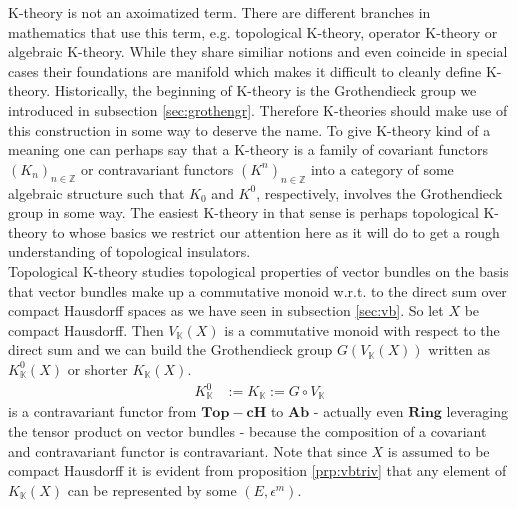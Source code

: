 \nocite{6342e665}
\nocite{8b5861fc}
\nocite{c7f15065}
K-theory is not an axoimatized term. There are different branches in mathematics that use this term, e.g. topological K-theory, operator K-theory or algebraic K-theory. While they share similiar notions and even coincide in special cases their foundations are manifold which makes it difficult to cleanly define K-theory. Historically, the beginning of K-theory is the Grothendieck group we introduced in subsection \ref{sec:grothengr}. Therefore K-theories should make use of this construction in some way to deserve the name. To give K-theory kind of a meaning one can perhaps say that a K-theory is a family of covariant functors $(K_{n})_{n\in\mathbb{Z}}$ or contravariant functors $(K^{n})_{n\in\mathbb{Z}}$ into a category of some algebraic structure such that $K_{0}$ and $K^{0}$, respectively, involves the Grothendieck group in some way. The easiest K-theory in that sense is perhaps topological K-theory to whose basics we restrict our attention here as it will do to get a rough understanding of topological insulators.
\\
Topological K-theory studies topological properties of vector bundles on the basis that vector bundles make up a commutative monoid w.r.t. to the direct sum over compact Hausdorff spaces as we have seen in subsection \ref{sec:vb}. So let $X$ be compact Hausdorff. Then $V_{\mathbb{K}}(X)$ is a commutative monoid with respect to the direct sum and we can build the Grothendieck group $G(V_{\mathbb{K}}(X))$ written as $K_{\mathbb{K}}^{0}(X)$ or shorter $K_{\mathbb{K}}(X)$.
\begin{align*}
  K_{\mathbb{K}}^{0}
  &:=
  K_{\mathbb{K}}
  :=
  G
  \circ
  V_{\mathbb{K}}
\end{align*}
is a contravariant functor from $\mathbf{Top-cH}$ to $\mathbf{Ab}$ - actually even $\mathbf{Ring}$ leveraging the tensor product on vector bundles - because the composition of a covariant and contravariant functor is contravariant. Note that since $X$ is assumed to be compact Hausdorff it is evident from proposition \ref{prp:vbtriv} that any element of $K_{\mathbb{K}}(X)$ can be represented by some $(E,\epsilon^{m})$.
\\
